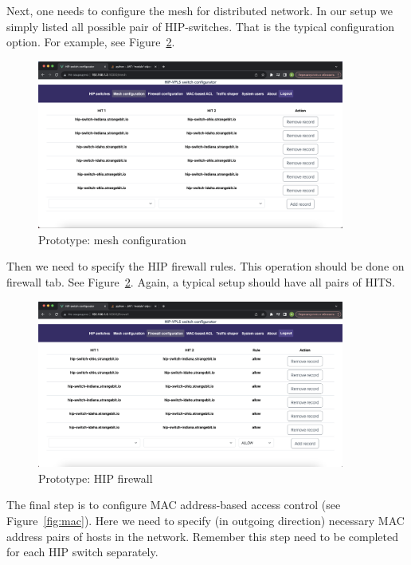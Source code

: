 Next, one needs to configure the mesh for distributed network. In our setup we simply listed
all possible pair of HIP-switches. That is the typical configuration option. For example, see
Figure~\ref{fig:mesh}.

\begin{figure}[h!]
\centering
\includegraphics[width=0.9\textwidth]{graphics/mesh.png}
\caption{Prototype: mesh configuration}
\label{fig:mesh}
\end{figure}

Then we need to specify the HIP firewall rules. This operation should be done on firewall tab. 
See Figure~\ref{fig:mesh}. Again, a typical setup should have all pairs of HITS.

\begin{figure}[h!]
\centering
\includegraphics[width=0.9\textwidth]{graphics/HIP-firewall.png}
\caption{Prototype: HIP firewall}
\label{fig:mesh}
\end{figure}

The final step is to configure MAC address-based access control (see Figure~\ref{fig:mac}). 
Here we need to specify (in outgoing direction) necessary MAC address pairs of hosts in the network.
Remember this step need to be completed for each HIP switch separately.

